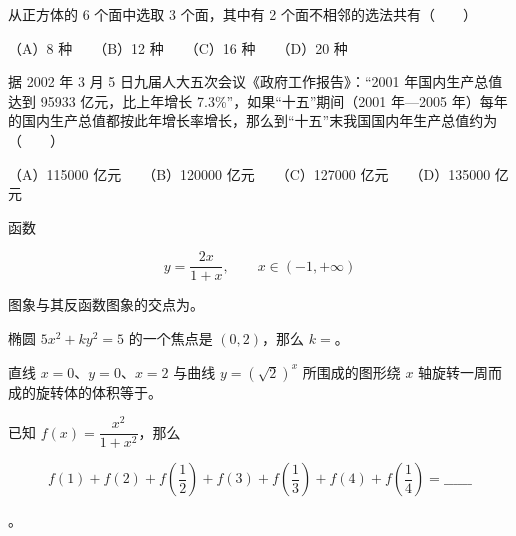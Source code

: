 \begin{question}
从正方体的 6 个面中选取 3 个面，其中有 2 个面不相邻的选法共有\mbox{（　　）}

（A）8 种　　（B）12 种　　（C）16 种　　（D）20 种

\end{question}
\begin{question}
据 2002 年 3 月 5 日九届人大五次会议《政府工作报告》：“2001 年国内生产总值达到 95933 亿元，比上年增长 7.3\%”，如果“十五”期间（2001 年—2005 年）每年的国内生产总值都按此年增长率增长，那么到“十五”末我国国内年生产总值约为\mbox{（　　）}

（A）115000 亿元　　（B）120000 亿元　　（C）127000 亿元　　（D）135000 亿元

\end{question}

\begin{question}
函数

\nopagebreak[4]
\[
y=\frac{2x}{1+x},\qquad x\in(-1,+\infty)
\]

图象与其反函数图象的交点为\gkblank{}。

\end{question}
\begin{question}
椭圆 $5x^2+ky^2=5$ 的一个焦点是 $(0,2)$，那么 $k=$\gkblank{}。

\end{question}
\begin{question}
直线 $x=0\text{、}y=0\text{、}x=2$ 与曲线 $y=(\sqrt2)^x$ 所围成的图形绕 $x$ 轴旋转一周而成的旋转体的体积等于\gkblank{}。

\end{question}
\begin{question}
已知 $f(x)=\dfrac{x^2}{1+x^2}$，那么

\nopagebreak[4]
\[
f(1)+f(2)+f\left(\frac12\right)+f(3)+f\left(\frac13\right)+f(4)+f\left(\frac14\right)=\_\_\_\_\_\_
\]

。

\end{question}

